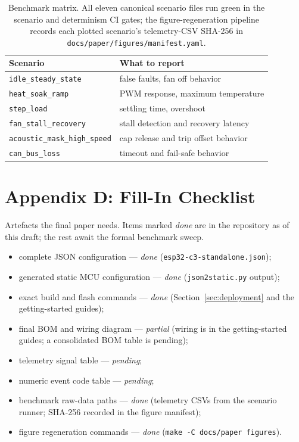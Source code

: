 \begin{table}[h]
\centering
\begin{tabular}{p{}p{}}
\toprule
\textbf{Scenario} & \textbf{What to report} \\
\midrule
\texttt{idle\_steady\_state} & false faults, fan off behavior \\
\texttt{heat\_soak\_ramp} & PWM response, maximum temperature \\
\texttt{step\_load} & settling time, overshoot \\
\texttt{fan\_stall\_recovery} & stall detection and recovery latency \\
\texttt{acoustic\_mask\_high\_speed} & cap release and trip offset behavior \\
\texttt{can\_bus\_loss} & timeout and fail-safe behavior \\
\bottomrule
\end{tabular}
\caption{Benchmark matrix. All eleven canonical scenario files run green in the scenario and determinism CI gates; the figure-regeneration pipeline records each plotted scenario's telemetry-CSV SHA-256 in \texttt{docs/paper/figures/manifest.yaml}.}
\end{table}

\section{Appendix D: Fill-In Checklist}

Artefacts the final paper needs. Items marked \emph{done} are in the repository as of this draft; the rest await the formal benchmark sweep.

\begin{itemize}[leftmargin=*]
    \item complete JSON configuration --- \emph{done} (\texttt{esp32-c3-standalone.json});
    \item generated static MCU configuration --- \emph{done} (\texttt{json2static.py} output);
    \item exact build and flash commands --- \emph{done} (Section~\ref{sec:deployment} and the getting-started guides);
    \item final BOM and wiring diagram --- \emph{partial} (wiring is in the getting-started guides; a consolidated BOM table is pending);
    \item telemetry signal table --- \emph{pending};
    \item numeric event code table --- \emph{pending};
    \item benchmark raw-data paths --- \emph{done} (telemetry CSVs from the scenario runner; SHA-256 recorded in the figure manifest);
    \item figure regeneration commands --- \emph{done} (\texttt{make -C docs/paper figures}).
\end{itemize}

\endinput
